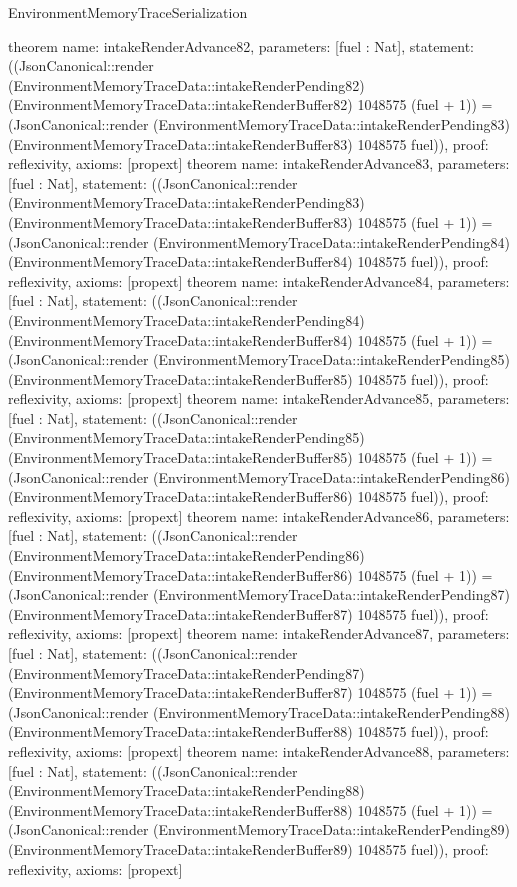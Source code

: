 \begin{lexlean}{EnvironmentMemoryTraceSerialization}
\begin{semanticmodule}
{}
theorem{
 name: intakeRenderAdvance82, parameters: [fuel : Nat],
 statement: ((JsonCanonical::render (EnvironmentMemoryTraceData::intakeRenderPending82) (EnvironmentMemoryTraceData::intakeRenderBuffer82) 1048575 (fuel + 1)) = (JsonCanonical::render (EnvironmentMemoryTraceData::intakeRenderPending83) (EnvironmentMemoryTraceData::intakeRenderBuffer83) 1048575 fuel)), proof: reflexivity{}, axioms: [propext]
}
theorem{
 name: intakeRenderAdvance83, parameters: [fuel : Nat],
 statement: ((JsonCanonical::render (EnvironmentMemoryTraceData::intakeRenderPending83) (EnvironmentMemoryTraceData::intakeRenderBuffer83) 1048575 (fuel + 1)) = (JsonCanonical::render (EnvironmentMemoryTraceData::intakeRenderPending84) (EnvironmentMemoryTraceData::intakeRenderBuffer84) 1048575 fuel)), proof: reflexivity{}, axioms: [propext]
}
theorem{
 name: intakeRenderAdvance84, parameters: [fuel : Nat],
 statement: ((JsonCanonical::render (EnvironmentMemoryTraceData::intakeRenderPending84) (EnvironmentMemoryTraceData::intakeRenderBuffer84) 1048575 (fuel + 1)) = (JsonCanonical::render (EnvironmentMemoryTraceData::intakeRenderPending85) (EnvironmentMemoryTraceData::intakeRenderBuffer85) 1048575 fuel)), proof: reflexivity{}, axioms: [propext]
}
theorem{
 name: intakeRenderAdvance85, parameters: [fuel : Nat],
 statement: ((JsonCanonical::render (EnvironmentMemoryTraceData::intakeRenderPending85) (EnvironmentMemoryTraceData::intakeRenderBuffer85) 1048575 (fuel + 1)) = (JsonCanonical::render (EnvironmentMemoryTraceData::intakeRenderPending86) (EnvironmentMemoryTraceData::intakeRenderBuffer86) 1048575 fuel)), proof: reflexivity{}, axioms: [propext]
}
theorem{
 name: intakeRenderAdvance86, parameters: [fuel : Nat],
 statement: ((JsonCanonical::render (EnvironmentMemoryTraceData::intakeRenderPending86) (EnvironmentMemoryTraceData::intakeRenderBuffer86) 1048575 (fuel + 1)) = (JsonCanonical::render (EnvironmentMemoryTraceData::intakeRenderPending87) (EnvironmentMemoryTraceData::intakeRenderBuffer87) 1048575 fuel)), proof: reflexivity{}, axioms: [propext]
}
theorem{
 name: intakeRenderAdvance87, parameters: [fuel : Nat],
 statement: ((JsonCanonical::render (EnvironmentMemoryTraceData::intakeRenderPending87) (EnvironmentMemoryTraceData::intakeRenderBuffer87) 1048575 (fuel + 1)) = (JsonCanonical::render (EnvironmentMemoryTraceData::intakeRenderPending88) (EnvironmentMemoryTraceData::intakeRenderBuffer88) 1048575 fuel)), proof: reflexivity{}, axioms: [propext]
}
theorem{
 name: intakeRenderAdvance88, parameters: [fuel : Nat],
 statement: ((JsonCanonical::render (EnvironmentMemoryTraceData::intakeRenderPending88) (EnvironmentMemoryTraceData::intakeRenderBuffer88) 1048575 (fuel + 1)) = (JsonCanonical::render (EnvironmentMemoryTraceData::intakeRenderPending89) (EnvironmentMemoryTraceData::intakeRenderBuffer89) 1048575 fuel)), proof: reflexivity{}, axioms: [propext]
}
\end{semanticmodule}
\end{lexlean}
